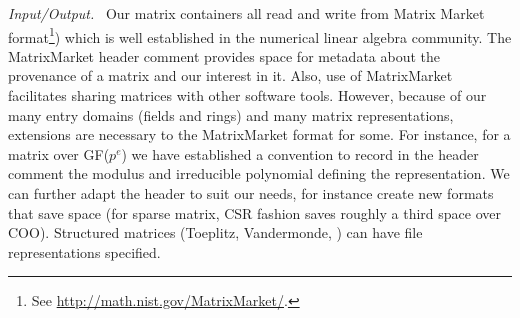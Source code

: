 \def\monitem#1{\par\textit{#1}\ }
\monitem{Input/Output.}
		Our matrix containers all read and write from Matrix Market
		format\footnote{See \url{http://math.nist.gov/MatrixMarket/}.})
		which is well established in the numerical linear algebra
community.
The MatrixMarket header comment provides space for metadata about the provenance of a matrix and our interest in it.  Also, use of MatrixMarket facilitates sharing matrices with other software tools.  However, because of our many entry domains (fields and rings) and many matrix representations, extensions are necessary to the MatrixMarket format for some.
For instance, for a matrix over GF($p^e$) we have established a convention to record in the header comment the modulus and irreducible polynomial defining the representation.
We can further adapt the header to suit our needs, for instance
create new formats that save space (for sparse matrix, CSR fashion saves
roughly a third space over COO). Structured matrices
(Toeplitz, Vandermonde, \etc)
can have file representations specified.
%
\begin{comment}
		\monitem{Accessing Elements.}
		The function \texttt{setEntry} can be
		used to populate the matrix (from some \texttt{init()} until a
		\texttt{finish()} is emitted).  The function \texttt{setEntry}
		can be costly (for some sparse formats for instance)
%
		Other functions such as {\tt refEntry} (that retrieves a
		writable reference to an entry) may be difficult to implement
		or inefficient (compressed fields, sparse matrices);
		\texttt{getEntry} may be specialized.
		Accessing (read or write) elements, rows or columns through
		iterators, although handy, is not required because it can be
		tricky to implement (compressed fields, hybrid or
		recursive formats). Traits on matrices where efficient iterators
		are available allow for their selections in some algorithms.
\end{comment}
